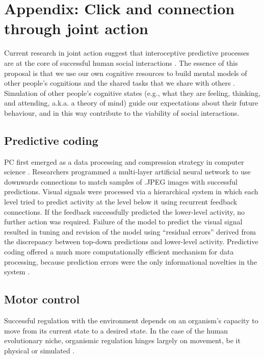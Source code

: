 \chapter{\label{app2:theory}Appendix: Click and connection through joint action}


Current research in joint action suggest that interoceptive predictive processes are at the core of successful human social interactions \citep{Graziano2013,Manera2013,Sparenberg2012,Springer2012}.  The essence of this proposal is that we use our own cognitive resources to build mental models of other people’s cognitions and the shared tasks that we share with others \citep{Tomasello2005a}.  Simulation of other people’s cognitive states (e.g., what they are feeling, thinking, and attending, a.k.a. a theory of mind) guide our expectations about their future behaviour, and in this way contribute to the viability of social interactions.



\section{Predictive coding\label{app2:predictiveCoding}}

PC first emerged as a data processing and compression strategy in computer science \citep{Rao1999}.  Researchers programmed a multi-layer artificial neural network to use downwards connections to match samples of .JPEG images with successful predictions. Visual signals were processed via a hierarchical system in which each level tried to predict activity at the level below it using recurrent feedback connections. If the feedback successfully predicted the lower-level activity, no further action was required. Failure of the model to predict the visual signal resulted in tuning and revision of the model using ``residual errors'' derived from the discrepancy between top-down predictions and lower-level activity.  Predictive coding offered a much more computationally efficient mechanism for data processing, because prediction errors were the only informational novelties in the system \citep{Clark2015}.



\section{Motor control\label{app2:motorControl}}
Successful regulation with the environment depends on an organism's capacity to move from its current state to a desired state.  In the case of the human evolutionary niche, organismic regulation hinges largely on movement, be it physical or simulated \citep{Wolpert1995}.

